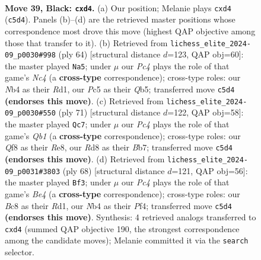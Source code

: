 \documentclass[11pt]{article}
\begin{document}
\clearpage

\begin{figure}[p]\centering
\begin{subfigure}{0.46\textwidth}\centering
\resizebox{\linewidth}{!}{%
\newchessgame
\chessboard[
  setfen={rnbr1q2/1p4k1/4p3/p1p2p1p/PnNP1P2/1P2QNP1/4B1KP/3R3R b - - 2 39},
  showmover=false,
  pgfstyle=straightmove, color=movearrow, markmove={c5-d4}
]}
\caption{}
\end{subfigure}\hfill
\begin{subfigure}{0.46\textwidth}\centering
\resizebox{\linewidth}{!}{%
\newchessgame
\chessboard[
  setfen={1k3r1r/b1p1q3/PpB2n2/1Qp1p2p/2N1P1pP/2P3P1/6P1/R2R2K1 w - - 12 33},
  showmover=false,
  pgfstyle=straightmove, color=movearrow, markmove={c4-a5}
]}
\caption{}
\end{subfigure}
\\[4pt]
\begin{subfigure}{0.46\textwidth}\centering
\resizebox{\linewidth}{!}{%
\newchessgame
\chessboard[
  setfen={1q2r1k1/1b1p1npp/1n2pp2/p6P/1pP1PN2/1P2Q1P1/P4PB1/3RR1K1 b - - 1 36},
  showmover=false,
  pgfstyle=straightmove, color=movearrow, markmove={b8-c7}
]}
\caption{}
\end{subfigure}\hfill
\begin{subfigure}{0.46\textwidth}\centering
\resizebox{\linewidth}{!}{%
\newchessgame
\chessboard[
  setfen={2r2r2/4qpk1/1p2pnp1/p1b1N2p/P3BP1P/1P2P3/5P2/1QRR2K1 w - - 1 35},
  showmover=false,
  pgfstyle=straightmove, color=movearrow, markmove={e4-f3}
]}
\caption{}
\end{subfigure}
\caption{\textbf{Move 39, Black: \texttt{cxd4}.} (a) Our position; Melanie plays \texttt{cxd4} (\texttt{c5d4}). Panels (b)--(d) are the retrieved master positions whose correspondence most drove this move (highest QAP objective among those that transfer to it). (b) Retrieved from \texttt{lichess\_elite\_2024-09\_p0030\#998} (ply 64) [structural distance $d$=123, QAP obj=60]: the master played \texttt{Na5}; under $\mu$ our \emph{Pc4} plays the role of that game's \emph{Nc4} (a \textbf{cross-type} correspondence); cross-type roles: our \emph{N}b4 as their \emph{R}d1, our \emph{P}c5 as their \emph{Q}b5; transferred move \texttt{c5d4} \textbf{(endorses this move)}. (c) Retrieved from \texttt{lichess\_elite\_2024-09\_p0030\#550} (ply 71) [structural distance $d$=122, QAP obj=58]: the master played \texttt{Qc7}; under $\mu$ our \emph{Pc4} plays the role of that game's \emph{Qb1} (a \textbf{cross-type} correspondence); cross-type roles: our \emph{Q}f8 as their \emph{R}e8, our \emph{R}d8 as their \emph{B}b7; transferred move \texttt{c5d4} \textbf{(endorses this move)}. (d) Retrieved from \texttt{lichess\_elite\_2024-09\_p0031\#3803} (ply 68) [structural distance $d$=121, QAP obj=56]: the master played \texttt{Bf3}; under $\mu$ our \emph{Pc4} plays the role of that game's \emph{Be4} (a \textbf{cross-type} correspondence); cross-type roles: our \emph{B}c8 as their \emph{R}d1, our \emph{N}b4 as their \emph{P}f4; transferred move \texttt{c5d4} \textbf{(endorses this move)}. Synthesis: 4 retrieved analogs transferred to \texttt{cxd4} (summed QAP objective 190, the strongest correspondence among the candidate moves); Melanie committed it via the \texttt{search} selector.}

\end{figure}
\end{document}
